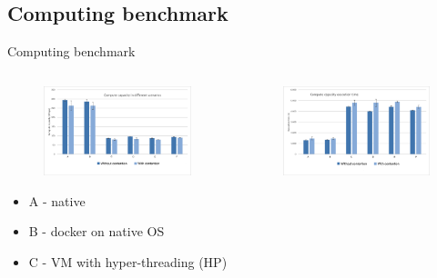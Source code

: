 \subsection{Computing benchmark}
\begin{frame}{Computing benchmark}
	\begin{columns}
		\begin{column}{0.5\textwidth}
			\begin{figure}
				\centering{}
				\includegraphics[scale=0.12]{images/cpu-capacity.png}
			\end{figure}
			\begin{itemize}
				\item[]{\scriptsize{A - native}}
				\item[]{\scriptsize{B - docker on native OS}}
				\item[]{\scriptsize{C - VM with hyper-threading (HP) }}
			\end{itemize}
		\end{column}
		\begin{column}{0.5\textwidth}
			\begin{figure}
				\centering{}
				\includegraphics[scale=0.12]{images/cpu-time.png}

\end{figure}
\end{column}
\end{columns}
\end{frame}
